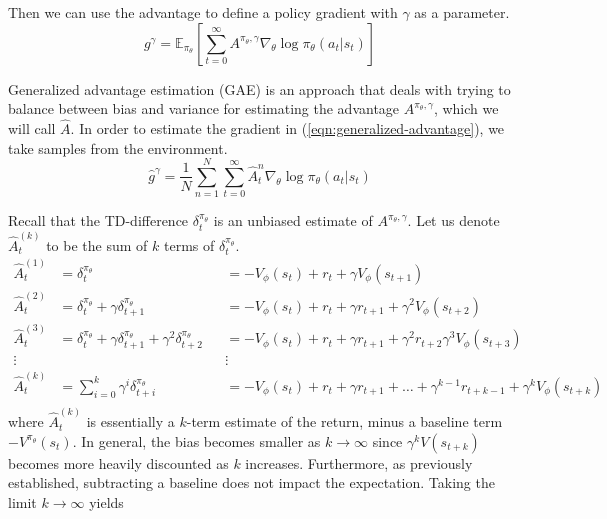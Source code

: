 \documentclass[journal, onecolumn, 12pt, draftclsnofoot]{IEEEtran}
\begin{document}
		Then we can use the advantage to define a policy gradient with $\gamma$ as a parameter.
		\begin{equation}
			\label{eqn:generalized-advantage}
			g^\gamma = \mathbb{E}_{\pi_\theta} \left[ \sum_{t=0}^\infty A^{\pi_\theta, \gamma} \nabla_\theta \log \pi_\theta(a_t \big\vert s_t) \right]
		\end{equation}
		\par Generalized advantage estimation (GAE) is an approach that deals with trying to balance between bias and variance for estimating the advantage $A^{\pi_\theta, \gamma}$, which we will call $\hat{A}$. In order to estimate the gradient in (\ref{eqn:generalized-advantage}), we take samples from the environment.
		\begin{equation}
			\label{eqn:gradient-estimator}
			\hat{g}^\gamma = \frac{1}{N} \sum_{n=1}^N \sum_{t=0}^\infty \hat{A}^n_t \nabla_\theta \log \pi_\theta(a_t \big\vert s_t)
		\end{equation}
		\par Recall that the TD-difference $\delta_t^{\pi_\theta}$ is an unbiased estimate of $A^{\pi_\theta, \gamma}$. Let us denote $\hat{A}_t^{(k)}$ to be the sum of $k$ terms of $\delta_t^{\pi_\theta}$.
		\begin{align*}
			\hat{A}_t^{(1)} &= \delta_t^{\pi_\theta} &&= -V_\phi(s_t) + r_t + \gamma V_\phi(s_{t+1}) \\
			\hat{A}_t^{(2)} &= \delta_t^{\pi_\theta} + \gamma \delta_{t+1}^{\pi_\theta} &&= -V_\phi(s_t) + r_t + \gamma r_{t+1} +  \gamma^2 V_\phi(s_{t+2}) \\
			\hat{A}_t^{(3)} &= \delta_t^{\pi_\theta} + \gamma \delta_{t+1}^{\pi_\theta} + \gamma^2 \delta_{t+2}^{\pi_\theta} &&= -V_\phi(s_t) + r_t + \gamma r_{t+1} + \gamma^2 r_{t+2} \gamma^3 V_\phi(s_{t+3}) \\
			\vdots &&& \vdots \\
			\hat{A}_t^{(k)} &= \sum_{i=0}^k \gamma^i \delta_{t+i}^{\pi_\theta} &&= -V_\phi(s_t) + r_t + \gamma r_{t+1} + \dots + \gamma^{k-1} r_{t+k-1} +  \gamma^k V_\phi(s_{t+k}) \\
		\end{align*}
		where $\hat{A}_t^{(k)}$ is essentially a $k$-term estimate of the return, minus a baseline term $-V^{\pi_\theta}(s_t)$. In general, the bias becomes smaller as $k \to \infty$ since $\gamma^k V(s_{t+k})$ becomes more heavily discounted as $k$ increases. Furthermore, as previously established, subtracting a baseline does not impact the expectation. Taking the limit $k \to \infty$ yields
\end{document}
